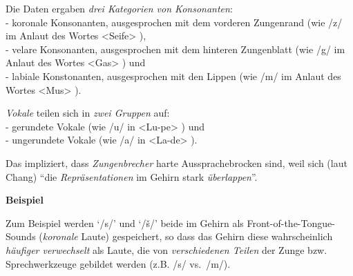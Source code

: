 \documentclass[
  letterpaper,
]{scrbook}
\begin{document}
\begin{tcolorbox}[enhanced jigsaw, colbacktitle=quarto-callout-important-color!10!white, left=2mm, toprule=.15mm, colback=white, leftrule=.75mm, breakable, coltitle=black, colframe=quarto-callout-important-color-frame, bottomtitle=1mm, opacityback=0, title=\textcolor{quarto-callout-important-color}{\faExclamation}\hspace{0.5em}{Important}, rightrule=.15mm, bottomrule=.15mm, toptitle=1mm, opacitybacktitle=0.6, titlerule=0mm, arc=.35mm]

Die Daten ergaben \emph{drei Kategorien von Konsonanten}:\\
- koronale Konsonanten, ausgesprochen mit dem vorderen Zungenrand (wie
/z/ im Anlaut des Wortes \textless Seife\textgreater{} ),\\
- velare Konsonanten, ausgesprochen mit dem hinteren Zungenblatt (wie
/g/ im Anlaut des Wortes \textless Gas\textgreater{} ) und\\
- labiale Konstonanten, ausgesprochen mit den Lippen (wie /m/ im Anlaut
des Wortes \textless Mus\textgreater{} ).

\emph{Vokale} teilen sich in \emph{zwei Gruppen} auf:\\
- gerundete Vokale (wie /u/ in \textless Lu-pe\textgreater{} ) und\\
- ungerundete Vokale (wie /a/ in \textless La-de\textgreater{} ).

\end{tcolorbox}

Das impliziert, dass \emph{Zungenbrecher} harte Aussprachebrocken sind,
weil sich (laut Chang) ``die \emph{Repräsentationen} im Gehirn stark
\emph{überlappen}''.

\begin{tcolorbox}[enhanced jigsaw, colframe=quarto-callout-note-color-frame, toprule=.15mm, opacityback=0, rightrule=.15mm, colback=white, leftrule=.75mm, breakable, arc=.35mm, bottomrule=.15mm, left=2mm]
\begin{minipage}[t]{5.5mm}
\textcolor{quarto-callout-note-color}{\faInfo}
\end{minipage}%
\begin{minipage}[t]{\textwidth - 5.5mm}

\textbf{Beispiel}\vspace{2mm}

Zum Beispiel werden `/s/' und `/š/' beide im Gehirn als
Front-of-the-Tongue-Sounds (\emph{koronale} Laute) gespeichert, so dass
das Gehirn diese wahrscheinlich \emph{häufiger verwechselt} als Laute,
die von \emph{verschiedenen Teilen} der Zunge bzw. Sprechwerkzeuge
gebildet werden (z.B. /s/ vs.~/m/).

\end{minipage}%
\end{tcolorbox}
\end{document}

